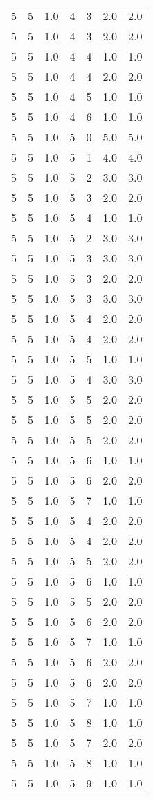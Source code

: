 \documentclass[a4paper,12pt]{article}
\begin{document}
\begin{center}
\begin{longtable}{ c c c | c c c | c }
        5 & 5 & 1.0 & 4 & 3 & 2.0 & 2.0 \\
        5 & 5 & 1.0 & 4 & 3 & 2.0 & 2.0 \\
        5 & 5 & 1.0 & 4 & 4 & 1.0 & 1.0 \\
        5 & 5 & 1.0 & 4 & 4 & 2.0 & 2.0 \\
        5 & 5 & 1.0 & 4 & 5 & 1.0 & 1.0 \\
        5 & 5 & 1.0 & 4 & 6 & 1.0 & 1.0 \\
        5 & 5 & 1.0 & 5 & 0 & 5.0 & 5.0 \\
        5 & 5 & 1.0 & 5 & 1 & 4.0 & 4.0 \\
        5 & 5 & 1.0 & 5 & 2 & 3.0 & 3.0 \\
        5 & 5 & 1.0 & 5 & 3 & 2.0 & 2.0 \\
        5 & 5 & 1.0 & 5 & 4 & 1.0 & 1.0 \\
        5 & 5 & 1.0 & 5 & 2 & 3.0 & 3.0 \\
        5 & 5 & 1.0 & 5 & 3 & 3.0 & 3.0 \\
        5 & 5 & 1.0 & 5 & 3 & 2.0 & 2.0 \\
        5 & 5 & 1.0 & 5 & 3 & 3.0 & 3.0 \\
        5 & 5 & 1.0 & 5 & 4 & 2.0 & 2.0 \\
        5 & 5 & 1.0 & 5 & 4 & 2.0 & 2.0 \\
        5 & 5 & 1.0 & 5 & 5 & 1.0 & 1.0 \\
        5 & 5 & 1.0 & 5 & 4 & 3.0 & 3.0 \\
        5 & 5 & 1.0 & 5 & 5 & 2.0 & 2.0 \\
        5 & 5 & 1.0 & 5 & 5 & 2.0 & 2.0 \\
        5 & 5 & 1.0 & 5 & 5 & 2.0 & 2.0 \\
        5 & 5 & 1.0 & 5 & 6 & 1.0 & 1.0 \\
        5 & 5 & 1.0 & 5 & 6 & 2.0 & 2.0 \\
        5 & 5 & 1.0 & 5 & 7 & 1.0 & 1.0 \\
        5 & 5 & 1.0 & 5 & 4 & 2.0 & 2.0 \\
        5 & 5 & 1.0 & 5 & 4 & 2.0 & 2.0 \\
        5 & 5 & 1.0 & 5 & 5 & 2.0 & 2.0 \\
        5 & 5 & 1.0 & 5 & 6 & 1.0 & 1.0 \\
        5 & 5 & 1.0 & 5 & 5 & 2.0 & 2.0 \\
        5 & 5 & 1.0 & 5 & 6 & 2.0 & 2.0 \\
        5 & 5 & 1.0 & 5 & 7 & 1.0 & 1.0 \\
        5 & 5 & 1.0 & 5 & 6 & 2.0 & 2.0 \\
        5 & 5 & 1.0 & 5 & 6 & 2.0 & 2.0 \\
        5 & 5 & 1.0 & 5 & 7 & 1.0 & 1.0 \\
        5 & 5 & 1.0 & 5 & 8 & 1.0 & 1.0 \\
        5 & 5 & 1.0 & 5 & 7 & 2.0 & 2.0 \\
        5 & 5 & 1.0 & 5 & 8 & 1.0 & 1.0 \\
        5 & 5 & 1.0 & 5 & 9 & 1.0 & 1.0
    \end{longtable}
\end{center}
\end{document}
